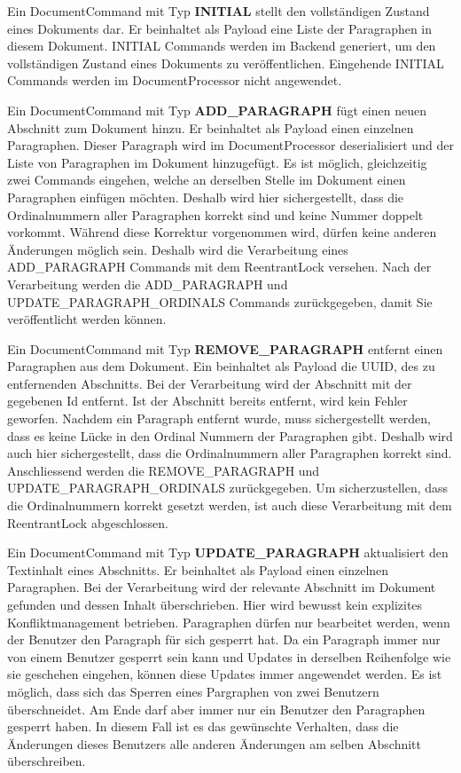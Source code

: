 Ein DocumentCommand mit Typ \textbf{INITIAL} stellt den vollständigen Zustand eines Dokuments dar.
Er beinhaltet als Payload eine Liste der Paragraphen in diesem Dokument.
INITIAL Commands werden im Backend generiert, um den vollständigen Zustand eines Dokuments zu veröffentlichen.
Eingehende INITIAL Commands werden im DocumentProcessor nicht angewendet.

Ein DocumentCommand mit Typ \textbf{ADD\_PARAGRAPH} fügt einen neuen Abschnitt zum Dokument hinzu.
Er beinhaltet als Payload einen einzelnen Paragraphen.
Dieser Paragraph wird im DocumentProcessor deserialisiert und der Liste von Paragraphen im Dokument hinzugefügt.
Es ist möglich, gleichzeitig zwei Commands eingehen, welche an derselben Stelle im Dokument einen Paragraphen einfügen möchten.
Deshalb wird hier sichergestellt, dass die Ordinalnummern aller Paragraphen korrekt sind und keine Nummer doppelt vorkommt.
Während diese Korrektur vorgenommen wird, dürfen keine anderen Änderungen möglich sein.
Deshalb wird die Verarbeitung eines ADD\_PARAGRAPH Commands mit dem ReentrantLock versehen.
Nach der Verarbeitung werden die ADD\_PARAGRAPH und UPDATE\_PARAGRAPH\_ORDINALS Commands zurückgegeben, damit Sie veröffentlicht werden können.

Ein DocumentCommand mit Typ \textbf{REMOVE\_PARAGRAPH} entfernt einen Paragraphen aus dem Dokument.
Ein beinhaltet als Payload die UUID, des zu entfernenden Abschnitts.
Bei der Verarbeitung wird der Abschnitt mit der gegebenen Id entfernt.
Ist der Abschnitt bereits entfernt, wird kein Fehler geworfen.
Nachdem ein Paragraph entfernt wurde, muss sichergestellt werden, dass es keine Lücke in den Ordinal Nummern der Paragraphen gibt.
Deshalb wird auch hier sichergestellt, dass die Ordinalnummern aller Paragraphen korrekt sind.
Anschliessend werden die REMOVE\_PARAGRAPH und UPDATE\_PARAGRAPH\_ORDINALS zurückgegeben.
Um sicherzustellen, dass die Ordinalnummern korrekt gesetzt werden, ist auch diese Verarbeitung mit dem ReentrantLock abgeschlossen.

Ein DocumentCommand mit Typ \textbf{UPDATE\_PARAGRAPH} aktualisiert den Textinhalt eines Abschnitts.
Er beinhaltet als Payload einen einzelnen Paragraphen.
Bei der Verarbeitung wird der relevante Abschnitt im Dokument gefunden und dessen Inhalt überschrieben.
Hier wird bewusst kein explizites Konfliktmanagement betrieben.
Paragraphen dürfen nur bearbeitet werden, wenn der Benutzer den Paragraph für sich gesperrt hat.
Da ein Paragraph immer nur von einem Benutzer gesperrt sein kann und Updates in derselben Reihenfolge wie sie geschehen eingehen, können diese Updates immer angewendet werden.
Es ist möglich, dass sich das Sperren eines Pargraphen von zwei Benutzern überschneidet.
Am Ende darf aber immer nur ein Benutzer den Paragraphen gesperrt haben.
In diesem Fall ist es das gewünschte Verhalten, dass die Änderungen dieses Benutzers alle anderen Änderungen am selben Abschnitt überschreiben. 

